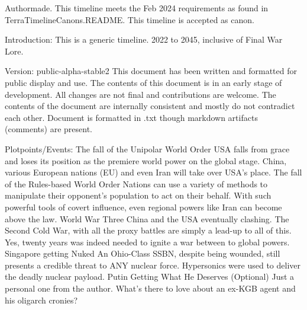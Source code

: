 Authormade.
This timeline meets the Feb 2024 requirements as found in TerraTimelineCanons.README. This timeline is accepted as canon. 

Introduction:
    This is a generic timeline. 2022 to 2045, inclusive of Final War Lore.

Version: public-alpha-stable2
    This document has been written and formatted for public display and use.
    The contents of this document is in an early stage of development. All changes are not final and contributions are welcome.
    The contents of the document are internally consistent and mostly do not contradict each other.
    Document is formatted in .txt though markdown artifacts (comments) are present.

Plotpoints/Events:
    The fall of the Unipolar World Order
        USA falls from grace and loses its position as the premiere world power on the global stage. China, various European nations (EU) and even Iran will take over USA's place.
    The fall of the Rules-based World Order
        Nations can use a variety of methods to manipulate their opponent's population to act on their behalf. With such powerful tools of covert influence, even regional powers like Iran can become above the law.
    World War Three
        China and the USA eventually clashing. 
        The Second Cold War, with all the proxy battles are simply a lead-up to all of this. Yes, twenty years was indeed needed to ignite a war between to global powers.
    Singapore getting Nuked
        An Ohio-Class SSBN, despite being wounded, still presents a credible threat to ANY nuclear force. Hypersonics were used to deliver the deadly nuclear payload.
    Putin Getting What He Deserves (Optional)
        Just a personal one from the author. What's there to love about an ex-KGB agent and his oligarch cronies?

